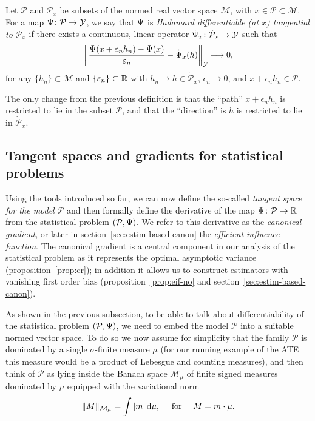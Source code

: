 \documentclass[a4,danish]{article}
\begin{document}
\begin{definition}
  Let $\mathcal{P}$ and $\dot{\mathcal{P}}_x$ be subsets of the normed real vector space
  $\mathcal{M}$, with $x \in \mathcal{P} \subset \mathcal{M}$. For a map
  $\operatorname{\Psi} \colon \mathcal{P} \rightarrow \mathcal{Y}$, we say that $\operatorname{\Psi}$ is \textit{Hadamard
    differentiable (at $x$) tangential to $\dot{\mathcal{P}}_x$} if there exists a continuous,
  linear operator $\dot{\operatorname{\Psi}}_x \colon \dot{\mathcal{P}}_x \rightarrow \mathcal{Y}$ such that
  \begin{equation*}
    \left\Vert
      \frac{\operatorname{\Psi}(x + \varepsilon_n h_n) - \operatorname{\Psi}(x)}{\varepsilon_n} - \dot{\operatorname{\Psi}}_x(h)
    \right\Vert_{\mathcal{Y}} \longrightarrow 0, 
  \end{equation*}
  for any $\{h_n\} \subset \mathcal{M}$ and $\{\varepsilon_n\} \subset \mathbb{R}$ with
  $h_n \rightarrow h \in \dot{\mathcal{P}}_x$, $\epsilon_n\rightarrow 0$, and
  $x + \epsilon_n h_n \in \mathcal{P}$.
\end{definition}

The only change from the previous definition is that the ``path'' $x + \epsilon_n h_n$ is restricted
to lie in the subset $\mathcal{P}$, and that the ``direction'' is $h$ is restricted to lie in
$\dot{\mathcal{P}}_x$.

\subsection{Tangent spaces and gradients for statistical problems}
\label{sec:tang-spac-grad}

Using the tools introduced so far, we can now define the so-called
\textit{tangent space for the model $\mathcal{P}$} and then formally
define the derivative of the map $\operatorname{\Psi}\colon\mathcal{P} \rightarrow \mathbb{R}$
from the statistical problem $(\mathcal{P}, \operatorname{\Psi})$. We refer to this
derivative as the \textit{canonical gradient}, or later in
section~\ref{sec:estim-based-canon} the \textit{efficient influence
  function}. The canonical gradient is a central component in our
analysis of the statistical problem as it represents the optimal
asymptotic variance (proposition~\ref{prop:cr}); in addition it allows
us to construct estimators with vanishing first order bias
(proposition~\ref{prop:eif-no} and
section~\ref{sec:estim-based-canon}).

As shown in the previous subsection, to be able to talk about differentiability of the statistical
problem $(\mathcal{P}, \operatorname{\Psi})$, we need to embed the model $\mathcal{P}$ into a suitable normed vector
space. To do so we now assume for simplicity that the family $\mathcal{P}$ is dominated by a single
$\sigma$-finite measure $\mu$ (for our running example of the ATE this measure would be a product of
Lebesgue and counting measures), and then think of $\mathcal{P}$ as lying inside the Banach space
$\mathcal{M}_{\mu}$ of finite signed measures dominated by $\mu$ equipped with the variational norm
\begin{equation*}
  \Vert M \Vert_{\mathcal{M}_{\mu}} = \int |m |\mathop{}\!\mathrm{d} \mu, \quad \text{ for } \quad M = m \cdot \mu.
\end{equation*}
\end{document}
